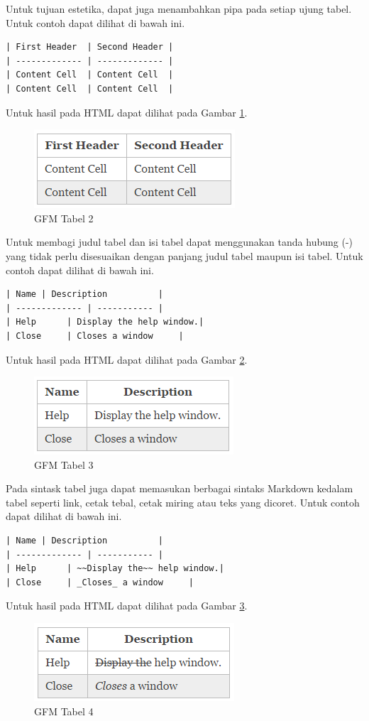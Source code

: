\begin{itemize}
\begin{itemize}
\begin{itemize}
Untuk tujuan estetika, dapat juga menambahkan pipa pada setiap ujung tabel.
Untuk contoh dapat dilihat di bawah ini.
\begin{lstlisting}[basicstyle=\footnotesize]
| First Header  | Second Header |
| ------------- | ------------- |
| Content Cell  | Content Cell  |
| Content Cell  | Content Cell  |
\end{lstlisting}
Untuk hasil pada HTML dapat dilihat pada Gambar \ref{fig:t2}.
\begin{figure}[H]
\centering
\includegraphics[scale=1]{Gambar/t2.png}
\caption[GFM Tabel 2]{GFM Tabel 2}
\label{fig:t2}
\end{figure}

Untuk membagi judul tabel dan isi tabel dapat menggunakan tanda hubung (-) yang tidak perlu disesuaikan dengan panjang judul tabel maupun isi tabel. Untuk contoh dapat dilihat di bawah ini.
\begin{lstlisting}[basicstyle=\footnotesize]
| Name | Description          |
| ------------- | ----------- |
| Help      | Display the help window.|
| Close     | Closes a window     |
\end{lstlisting}
Untuk hasil pada HTML dapat dilihat pada Gambar \ref{fig:t3}.
\begin{figure}[H]
\centering
\includegraphics[scale=1]{Gambar/t3.png}
\caption[GFM Tabel 3]{GFM Tabel 3}
\label{fig:t3}
\end{figure}

Pada sintask tabel juga dapat memasukan berbagai sintaks Markdown kedalam tabel seperti link, cetak tebal, cetak miring atau teks yang dicoret. Untuk contoh dapat dilihat di bawah ini.
\begin{lstlisting}[basicstyle=\footnotesize]
| Name | Description          |
| ------------- | ----------- |
| Help      | ~~Display the~~ help window.|
| Close     | _Closes_ a window     |
\end{lstlisting}
Untuk hasil pada HTML dapat dilihat pada Gambar \ref{fig:t4}.
\begin{figure}[H]
\centering
\includegraphics[scale=1]{Gambar/t4.png}
\caption[GFM Tabel 4]{GFM Tabel 4}
\label{fig:t4}
\end{figure}


\end{itemize}
\end{itemize}
\end{itemize}
